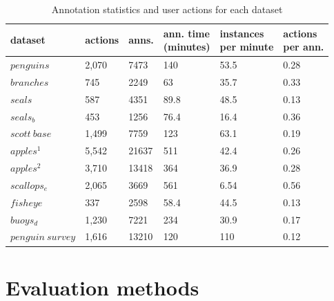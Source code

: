 \begin{table}[]
\centering
\caption{ Annotation statistics and user actions for each dataset }
\label{tab:annotation_table}
\begin{tabular}{llllll}
dataset           & actions & anns. & \shortstack {ann. time \\ (minutes)} & \shortstack{instances \\ per minute} & \shortstack{actions \\ per ann.} \\
\toprule
$penguins$        & 2,070   & 7473        & 140                       & 53.5                 & 0.28                   \\
$branches$        & 745     & 2249        & 63                        & 35.7                 & 0.33                   \\
$seals$           & 587     & 4351        & 89.8                      & 48.5                 & 0.13                   \\
$seals_b$         & 453     & 1256        & 76.4                      & 16.4                 & 0.36                   \\
$scott\:base$     & 1,499   & 7759        & 123                       & 63.1                 & 0.19                   \\
$apples^1$        & 5,542   & 21637       & 511                       & 42.4                 & 0.26                   \\
$apples^2$        & 3,710   & 13418       & 364                       & 36.9                 & 0.28                   \\
$scallops_e$      & 2,065   & 3669        & 561                       & 6.54                 & 0.56                   \\
$fisheye$         & 337     & 2598        & 58.4                      & 44.5                 & 0.13                   \\
$buoys_d$         & 1,230   & 7221        & 234                       & 30.9                 & 0.17                   \\
$penguin\:survey$ & 1,616   & 13210       & 120                       & 110                  & 0.12                  \\
\bottomrule
\end{tabular}
\end{table}



\section {Evaluation methods}
\label{sec:ann_evaluation}

